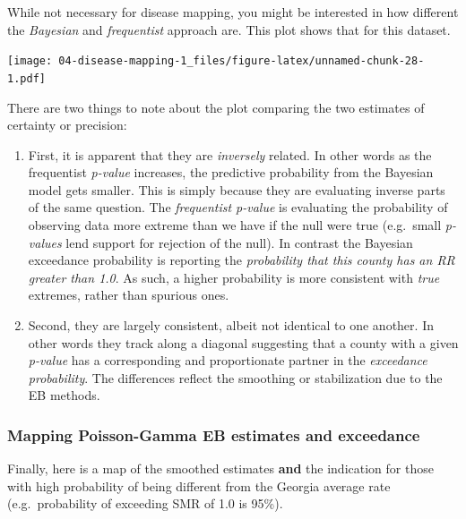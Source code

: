 \documentclass[
]{book}
\providecommand{\tightlist}{%
  \setlength{\itemsep}{0pt}\setlength{\parskip}{0pt}}
\begin{document}
While not necessary for disease mapping, you might be interested in how different the \emph{Bayesian} and \emph{frequentist} approach are. This plot shows that for this dataset.

\texttt{[image: 04-disease-mapping-1\_files/figure-latex/unnamed-chunk-28-1.pdf]}

There are two things to note about the plot comparing the two estimates of certainty or precision:

\begin{enumerate}
\def\labelenumi{\arabic{enumi}.}
\tightlist
\item
  First, it is apparent that they are \emph{inversely} related. In other words as the frequentist \emph{p-value} increases, the predictive probability from the Bayesian model gets smaller. This is simply because they are evaluating inverse parts of the same question. The \emph{frequentist p-value} is evaluating the probability of observing data more extreme than we have if the null were true (e.g.~small \emph{p-values} lend support for rejection of the null). In contrast the Bayesian exceedance probability is reporting the \emph{probability that this county has an RR greater than 1.0}. As such, a higher probability is more consistent with \emph{true} extremes, rather than spurious ones.\\
\item
  Second, they are largely consistent, albeit not identical to one another. In other words they track along a diagonal suggesting that a county with a given \emph{p-value} has a corresponding and proportionate partner in the \emph{exceedance probability}. The differences reflect the smoothing or stabilization due to the EB methods.
\end{enumerate}

\hypertarget{mapping-poisson-gamma-eb-estimates-and-exceedance}{%
\subsubsection{Mapping Poisson-Gamma EB estimates and exceedance}\label{mapping-poisson-gamma-eb-estimates-and-exceedance}}

Finally, here is a map of the smoothed estimates \textbf{and} the indication for those with high probability of being different from the Georgia average rate (e.g.~probability of exceeding SMR of 1.0 is 95\%).
\end{document}
